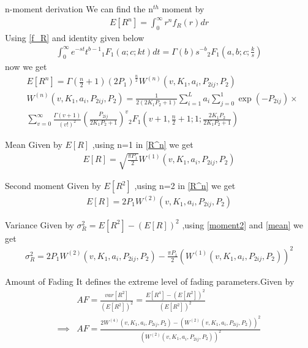 \documentclass{beamer}
\begin{document}
\begin{frame}
\begin{block}{n-moment derivation}
We can find the n\(^{th}\) moment by 
\begin{align}
    E[R^n]=\int_0^\infty r^n f_R (r)dr
\end{align}
Using \eqref{f_R} and identity given below
\begin{align}
    \int_0^\infty e^{-st} t^{b-1} {}_{1} F_{1}(a;c;kt)dt =\Gamma(b) s^{-b} {}_{2}F_{1}(a,b;c;\frac{k}{s})
\end{align}
now we get 
\begin{align}
    &E[R^n]=\Gamma(\frac{n}{2}+1) (2P_1)^{\frac{n}{2}} W^{(n)}(v,K_1,a_i,P_{2ij},P_2) \label{R^n} \\\nonumber
    &W^{(n)}(v,K_1,a_i,P_{2ij},P_2)=\frac{1}{2(2K_1P_2+1)} \sum_{i=1}^{L} a_i  \sum_{j=0}^{1} 
     \exp(-P_{2ij})  \times \\ \nonumber
    &\sum_{v=0}^\infty \frac{\Gamma(v+1)}{(v!)^2}\left(\frac{P_{2ij}}{2K_1P_2+1}\right)^v
    {}_{2}F_{1}\left(v+1,\frac{n}{2}+1;1;\frac{2K_1 P_2}{2K_1 P_2 +1}\right)
\end{align}
\end{block}
\end{frame}
\begin{frame}{}
\begin{block}{Mean}
Given by \(E[R]\) ,using n=1 in \eqref{R^n} we get
    \begin{align}
        E[R]=\sqrt{\frac{\pi P_1}{2}}W^{(1)}(v,K_1,a_i,P_{2ij},P_2) \label{mean}
    \end{align}
\end{block}
\begin{block}{Second moment}
Given by \(E[R^2]\) ,using n=2 in \eqref{R^n} we get
    \begin{align}
        E[R]=2P_1 W^{(2)}(v,K_1,a_i,P_{2ij},P_2) \label{moment2}
    \end{align}
\end{block}
\begin{block}{Variance}
Given by \(\sigma_{R}^{2}=E[R^2]-(E[R])^2\) ,using \eqref{moment2} and \eqref{mean} we get
    \begin{align}
    \sigma_{R}^{2}= 2P_1 W^{(2)}(v,K_1,a_i,P_{2ij},P_2) - \frac{\pi P_1}{2}(W^{(1)}(v,K_1,a_i,P_{2ij},P_2))^2\label{variance}
    \end{align}
\end{block}
\end{frame}
\begin{frame}{}
    \begin{block}{Amount of Fading}
    It  defines  the  extreme  level  of  fading  parameters.Given by
    \begin{align}\nonumber
        &AF=\frac{var[R^2]}{(E[R^2])^2}=\frac{E[R^4] -(E[R^2])^2}{(E[R^2])^2} \\
        \implies& AF=\frac{2W^{(4)}(v,K_1,a_i,P_{2ij},P_2) - (W^{(2)}(v,K_1,a_i,P_{2ij},P_2))^2}{(W^{(2)}(v,K_1,a_i,P_{2ij},P_2))^2}
    \end{align}
    \end{block}
    \end{frame}
\end{document}
